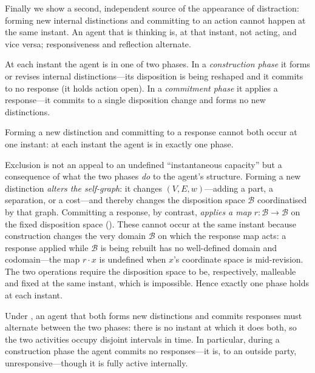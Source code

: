 \documentclass[11pt,twocolumn,a4paper]{article}
\newcommand{\Beh}{\mathcal{B}}       %
\newcommand{\resp}{r}                %
\begin{document}
Finally we show a second, independent source of the appearance of
distraction: forming new internal distinctions and committing to an action
cannot happen at the same instant. An agent that is thinking is, at that
instant, not acting, and vice versa; responsiveness and reflection
alternate.

\begin{definition}
\label{def:phases}
At each instant the agent is in one of two phases. In a \emph{construction
phase} it forms or revises internal distinctions---its disposition is
being reshaped and it commits to no response (it holds action open). In a
\emph{commitment phase} it applies a response---it commits to a single
disposition change and forms no new distinctions.
\end{definition}

\begin{axiom}
\label{ax:exclusion}
Forming a new distinction and committing to a response cannot both occur at
one instant: at each instant the agent is in exactly one phase.
\end{axiom}

\begin{remark}
\label{rem:exclusion-grounded}
Exclusion is not an appeal to an undefined ``instantaneous capacity'' but a
consequence of what the two phases \emph{do} to the agent's structure.
Forming a new distinction \emph{alters the self-graph}: it changes
$(V,E,w)$---adding a part, a separation, or a cost---and thereby changes
the disposition space $\Beh$ coordinatised by that graph. Committing a
response, by contrast, \emph{applies a map} $\resp:\Beh\to\Beh$ on the fixed
disposition space (). These cannot occur at the same
instant because construction changes the very domain $\Beh$ on which the
response map acts: a response applied while $\Beh$ is being rebuilt has no
well-defined domain and codomain---the map $\resp\!\cdot x$ is undefined
when $x$'s coordinate space is mid-revision. The two operations require the
disposition space to be, respectively, malleable and fixed at the same
instant, which is impossible. Hence exactly one phase holds at each instant.
\end{remark}

\begin{theorem}
\label{thm:alternation}
Under , an agent that both forms new distinctions and
commits responses must alternate between the two phases: there is no
instant at which it does both, so the two activities occupy disjoint
intervals in time. In particular, during a construction phase the agent
commits no responses---it is, to an outside party, unresponsive---though it
is fully active internally.
\end{theorem}
\end{document}
